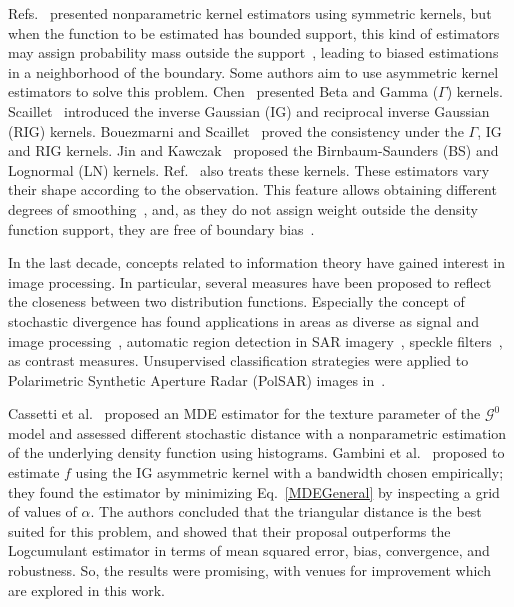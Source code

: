 \documentclass[twocolumn]{svjour3}
\begin{document}
	Refs.~\cite{Parzen62,Roseanblatt56} presented nonparametric kernel estimators using symmetric kernels, but when the function to be estimated has bounded support, this kind of estimators may assign probability mass outside the support~\cite{Silverman1986}, leading to biased estimations in a neighborhood of the boundary.
	Some authors aim to use asymmetric kernel estimators to solve this problem. 
	Chen~\cite{chen1999,chensx2000} presented Beta and Gamma ($\Gamma$) kernels.
	Scaillet~\cite{Scaillet2004} introduced the inverse Gaussian (IG) and reciprocal inverse Gaussian (RIG) kernels.
	Bouezmarni and Scaillet~\cite{bouezmarni2005} proved the consistency under the $\Gamma$, IG and RIG kernels. 
	Jin and Kawczak~\cite{Jin2003} proposed the Birnbaum-Saunders (BS) and Lognormal (LN) kernels. 
	Ref.~\cite{libengue2013} also treats these kernels. 
	These estimators vary their shape according to the observation. This feature allows obtaining different degrees of smoothing~\cite{Scaillet2004}, and, as they do not assign weight outside the density function support, they are free of boundary bias~\cite{chensx2000}.
	
	In the last decade, concepts related to information theory have gained interest in image processing. 
	In particular, several measures have been proposed to reflect the closeness between two distribution functions. 
	Especially the concept of stochastic divergence has found applications in areas as diverse as signal and image processing~\cite{Aviyente2007}, automatic region detection in SAR imagery~\cite{SilvaCribariFrery:ImprovedLikelihood:Environmetrics,Nascimento2009}, 
	speckle filters~\cite{Penna2019}, as contrast measures. 
	Unsupervised classification strategies were applied to Polarimetric Synthetic Aperture Radar (PolSAR) images in~\cite{Carvalho2019}.
	
	Cassetti et al.~\cite{APSAR2013ParameterEstimationStochasticDistances} proposed an MDE estimator for the texture parameter of the $\mathcal{G}^0$ model and assessed different stochastic distance with a nonparametric estimation of the underlying density function using histograms. 
	Gambini et al.~\cite{gambini2015} proposed to estimate $f$ using the IG asymmetric kernel with a bandwidth chosen empirically; 
	they found the estimator by minimizing Eq.~\eqref{MDEGeneral} by inspecting a grid of values of $\alpha$. 
	The authors concluded that the triangular distance is the best suited for this problem, and showed that their proposal outperforms the Logcumulant estimator in terms of mean squared error, bias, convergence, and robustness. 
	So, the results were promising, with venues for improvement which are explored in this work.
	
\end{document}
